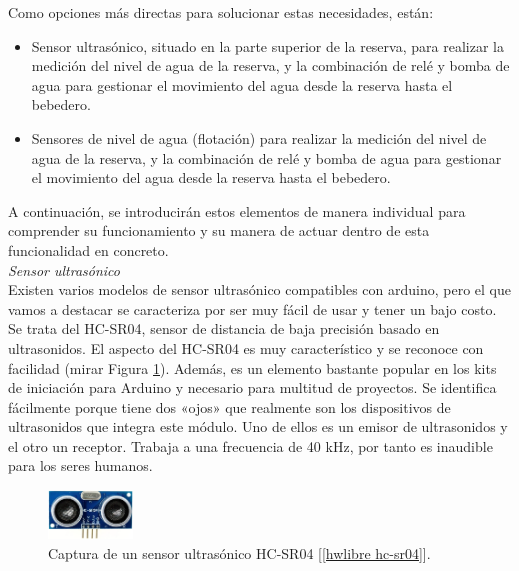 \documentclass[12pt]{article}
\begin{document}
	\noindent Como opciones más directas para solucionar estas necesidades, están: 
	
	\begin{itemize}
		\item Sensor ultrasónico, situado en la parte superior de la reserva, para realizar la medición del nivel de agua de la reserva, y la combinación de relé y bomba de agua para gestionar el movimiento del agua desde la reserva hasta el bebedero.
		\item Sensores de nivel de agua (flotación) para realizar la medición del nivel de agua de la reserva, y la combinación de relé y bomba de agua para gestionar el movimiento del agua desde la reserva hasta el bebedero.
	\end{itemize}
	
	\noindent A continuación, se introducirán estos elementos de manera individual para comprender su funcionamiento y su manera de actuar dentro de esta funcionalidad en concreto. \\
	
	\noindent \textit{Sensor ultrasónico}\\
	
	\noindent Existen varios modelos de sensor ultrasónico compatibles con arduino, pero el que vamos a destacar se caracteriza por ser muy fácil de usar y tener un bajo costo. Se trata del HC-SR04, sensor de distancia de baja precisión basado en ultrasonidos. El aspecto del HC-SR04 es muy característico y se reconoce con facilidad (mirar Figura \ref{captura hc-sr04}). Además, es un elemento bastante popular en los kits de iniciación para Arduino y necesario para multitud de proyectos. Se identifica fácilmente porque tiene dos «ojos» que realmente son los dispositivos de ultrasonidos que integra este módulo. Uno de ellos es un emisor de ultrasonidos y el otro un receptor. Trabaja a una frecuencia de 40 kHz, por tanto es inaudible para los seres humanos. \\

	
	\begin{figure}[h]
		\begin{center}
			\includegraphics[width=0.2\textwidth]{img/hc-sr04.png}
			\caption{Captura de un sensor ultrasónico HC-SR04 [\ref{hwlibre hc-sr04}].}
			\label{captura hc-sr04}
		\end{center}
	\end{figure}
	
\end{document}
